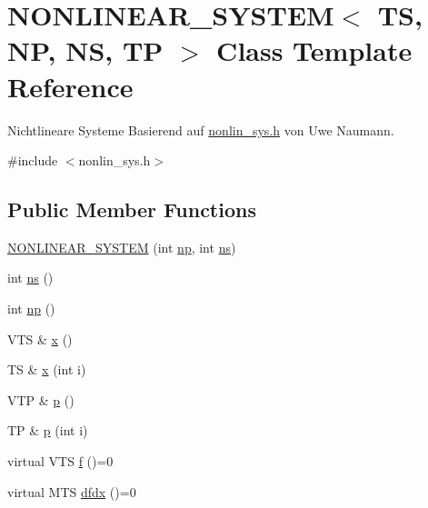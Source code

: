 \hypertarget{class_n_o_n_l_i_n_e_a_r___s_y_s_t_e_m}{}\section{N\+O\+N\+L\+I\+N\+E\+A\+R\+\_\+\+S\+Y\+S\+T\+EM$<$ TS, NP, NS, TP $>$ Class Template Reference}
\label{class_n_o_n_l_i_n_e_a_r___s_y_s_t_e_m}


Nichtlineare Systeme Basierend auf \mbox{\hyperlink{nonlin__sys_8h}{nonlin\+\_\+sys.\+h}} von Uwe Naumann.  




{\ttfamily \#include $<$nonlin\+\_\+sys.\+h$>$}

\subsection*{Public Member Functions}
\begin{DoxyCompactItemize}
\item 
\mbox{\hyperlink{class_n_o_n_l_i_n_e_a_r___s_y_s_t_e_m_aa6073542adb090bf99729df5b03ca707}{N\+O\+N\+L\+I\+N\+E\+A\+R\+\_\+\+S\+Y\+S\+T\+EM}} (int \mbox{\hyperlink{class_n_o_n_l_i_n_e_a_r___s_y_s_t_e_m_ab5876470030832088d8ee1ed609d5311}{np}}, int \mbox{\hyperlink{class_n_o_n_l_i_n_e_a_r___s_y_s_t_e_m_abf4102c649f8316e44033a76f9d6183f}{ns}})
\item 
int \mbox{\hyperlink{class_n_o_n_l_i_n_e_a_r___s_y_s_t_e_m_abf4102c649f8316e44033a76f9d6183f}{ns}} ()
\item 
int \mbox{\hyperlink{class_n_o_n_l_i_n_e_a_r___s_y_s_t_e_m_ab5876470030832088d8ee1ed609d5311}{np}} ()
\item 
V\+TS \& \mbox{\hyperlink{class_n_o_n_l_i_n_e_a_r___s_y_s_t_e_m_a74d8eaa53624eae38a6f2e6b5bdd4381}{x}} ()
\item 
TS \& \mbox{\hyperlink{class_n_o_n_l_i_n_e_a_r___s_y_s_t_e_m_aabd6041ce7d6aaad8ce55e03c2efde1e}{x}} (int i)
\item 
V\+TP \& \mbox{\hyperlink{class_n_o_n_l_i_n_e_a_r___s_y_s_t_e_m_a1536a98a6cb3fec681bdd3312ae43714}{p}} ()
\item 
TP \& \mbox{\hyperlink{class_n_o_n_l_i_n_e_a_r___s_y_s_t_e_m_a75739c8370b0aa04f8f03e88ac19d09b}{p}} (int i)
\item 
virtual V\+TS \mbox{\hyperlink{class_n_o_n_l_i_n_e_a_r___s_y_s_t_e_m_a65827d7df297f26cd3f14f472a212077}{f}} ()=0
\item 
virtual M\+TS \mbox{\hyperlink{class_n_o_n_l_i_n_e_a_r___s_y_s_t_e_m_a531f56bcbc77f2219164af40aa16fad2}{dfdx}} ()=0
\end{DoxyCompactItemize}
